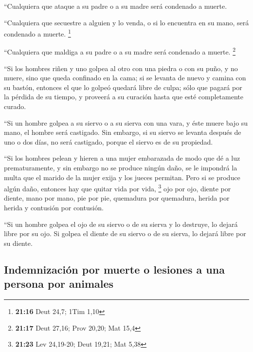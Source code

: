 \begin{paracol}{2}
 ``Cualquiera que ataque a su padre o a su madre será
condenado a muerte.

 ``Cualquiera que secuestre a alguien y lo venda, o si lo
encuentra en su mano, será condenado a muerte. \footnote{\textbf{21:16}
  Deut 24,7; 1Tim 1,10}

 ``Cualquiera que maldiga a su padre o a su madre será
condenado a muerte. \footnote{\textbf{21:17} Deut 27,16; Prov 20,20; Mat
  15,4}

 ``Si los hombres riñen y uno golpea al otro con una
piedra o con su puño, y no muere, sino que queda confinado en la cama;
 si se levanta de nuevo y camina con su bastón, entonces
el que lo golpeó quedará libre de culpa; sólo que pagará por la pérdida
de su tiempo, y proveerá a su curación hasta que esté completamente
curado.

 ``Si un hombre golpea a su siervo o a su sierva con una
vara, y éste muere bajo su mano, el hombre será castigado.
 Sin embargo, si su siervo se levanta después de uno o
dos días, no será castigado, porque el siervo es de su propiedad.

 ``Si los hombres pelean y hieren a una mujer embarazada
de modo que dé a luz prematuramente, y sin embargo no se produce ningún
daño, se le impondrá la multa que el marido de la mujer exija y los
jueces permitan.  Pero si se produce algún daño, entonces
hay que quitar vida por vida, \footnote{\textbf{21:23} Lev 24,19-20;
  Deut 19,21; Mat 5,38}  ojo por ojo, diente por diente,
mano por mano, pie por pie,  quemadura por quemadura,
herida por herida y contusión por contusión.

 ``Si un hombre golpea el ojo de su siervo o de su sierva
y lo destruye, lo dejará libre por su ojo.  Si golpea el
diente de su siervo o de su sierva, lo dejará libre por su diente.

\hypertarget{indemnizaciuxf3n-por-muerte-o-lesiones-a-una-persona-por-animales}{%
\subsection{Indemnización por muerte o lesiones a una persona por
animales}\label{indemnizaciuxf3n-por-muerte-o-lesiones-a-una-persona-por-animales}}


\end{paracol}
